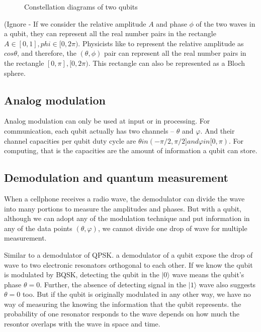 \documentclass{book}
\newcommand\keta[2][]{#1\lvert {#2} #1\rangle}
\begin{document}
\begin{figure}[ht]
\caption{Constellation diagrams of two qubits}
\label{QAM}
\end{figure}

(Ignore - If we consider the relative amplitude $A$ and phase $\phi$ of the two waves in a qubit, they can represent all the real number pairs in the rectangle ${ A \in [0,1], phi \in [0,2\pi) }$. Physicists like to represent the relative amplitude as $cos\theta$, and therefore, the $(\theta, \phi)$ pair can represent all the real number pairs in the rectangle ${[0,\pi],  [0,2\pi)}$. This rectangle can also be represented as a Bloch sphere.

\subsection{Analog modulation}
Analog modulation can only be used at input or in processing. For communication, each qubit actually has two channels -- $\theta$ and $\varphi$. And their channel capacities per qubit duty cycle are $\theta in (-\pi/2, \pi/2] and \varphi in [0, \pi)$. For computing, that is the capacities are the amount of information a qubit can store.

\subsection{Demodulation and quantum measurement}
When a cellphone receives a radio wave, the demodulator can divide the wave into many portions to measure the amplitudes and phases. But with a qubit, although we can adopt any of the modulation technique and put information in any of the data points $(\theta, \varphi)$, we cannot divide one drop of wave for multiple measurement.

Similar to a demodulator of QPSK. a demodulator of a qubit expose the drop of wave to two electronic resonators orthogonal to each other.  If we know the qubit is modulated by BQSK, detecting the qubit in the $\keta{0}$ wave means the qubit's phase $\theta = 0$. Further, the absence of detecting signal in the $\keta{1}$ wave also suggests $\theta = 0$ too. But if the qubit is originally modulated in any other way, we have no way of measuring the knowing the information that the qubit represents. the probability of one resonator responds to the wave depends on how much the resontor overlaps with the wave in space and time.
\end{document}
